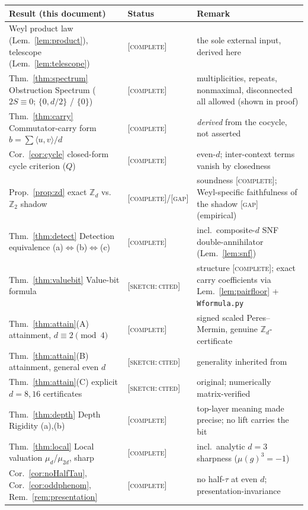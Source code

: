 \documentclass[11pt]{article}
\theoremstyle{definition}
\theoremstyle{remark}
\newcommand{\Z}{\mathbb{Z}}
\newcommand{\Zd}{\Z_d}
\newcommand{\ip}[2]{\langle #1,#2\rangle}
\newcommand{\CO}{\textnormal{\textsc{[complete]}}}
\newcommand{\SK}{\textnormal{\textsc{[sketch:\,cited]}}}
\newcommand{\GAP}{\textnormal{\textsc{[gap]}}}
\begin{document}
\begin{center}\small
\renewcommand{\arraystretch}{1.25}
\begin{tabular}{p{4.4cm}p{2.1cm}p{6.6cm}}
\toprule
Result (this document) & Status & Remark \\
\midrule
Weyl product law (Lem.~\ref{lem:product}), telescope (Lem.~\ref{lem:telescope})
 & \CO & the sole external input, derived here \\
Thm.~\ref{thm:spectrum} Obstruction Spectrum ($2S\equiv0$; $\{0,d/2\}$ / $\{0\}$)
 & \CO & multiplicities, repeats, nonmaximal, disconnected all allowed (shown in proof) \\
Thm.~\ref{thm:carry} Commutator-carry form $b=\sum\ip{u}{v}/d$
 & \CO & \emph{derived} from the cocycle, not asserted \\
Cor.~\ref{cor:cycle} closed-form cycle criterion ($Q$)
 & \CO & even-$d$; inter-context terms vanish by closedness \\
Prop.~\ref{prop:zd} exact $\Zd$ vs.\ $\Z_2$ shadow
 & \CO/\GAP & soundness \CO; Weyl-specific faithfulness of the shadow \GAP{} (empirical) \\
Thm.~\ref{thm:detect} Detection equivalence (a)$\Leftrightarrow$(b)$\Leftrightarrow$(c)
 & \CO & incl.\ composite-$d$ SNF double-annihilator (Lem.~\ref{lem:snf}) \\
Thm.~\ref{thm:valuebit} Value-bit formula
 & \SK & structure \CO; exact carry coefficients via Lem.~\ref{lem:pairfloor} + \texttt{Wformula.py} \\
Thm.~\ref{thm:attain}(A) attainment, $d\equiv2\pmod4$
 & \CO & signed scaled Peres--Mermin, genuine $\Zd$-certificate \\
Thm.~\ref{thm:attain}(B) attainment, general even $d$
 & \SK & generality inherited from \cite{ROZF} \\
Thm.~\ref{thm:attain}(C) explicit $d=8,16$ certificates
 & \SK & original; numerically matrix-verified \\
Thm.~\ref{thm:depth} Depth Rigidity (a),(b)
 & \CO & top-layer meaning made precise; no lift carries the bit \\
Thm.~\ref{thm:local} Local valuation $\mu_d$/$\mu_{2d}$, sharp
 & \CO & incl.\ analytic $d=3$ sharpness ($\mu(g)^3=-1$) \\
Cor.~\ref{cor:noHalfTau}, Cor.~\ref{cor:oddphenom}, Rem.~\ref{rem:presentation}
 & \CO & no half-$\tau$ at even $d$; presentation-invariance \\
\bottomrule
\end{tabular}
\end{center}
\end{document}
